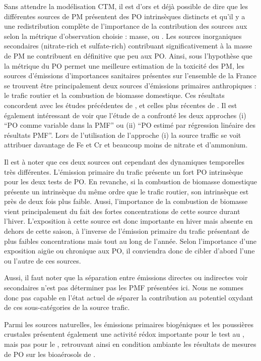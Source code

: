Sans attendre la modélisation CTM, il est d'ors et déjà possible de dire que les
différentes sources de PM présentent des PO intrinsèques distincts et qu'il y a une
redistribution complète de l'importance de la contribution des sources aux \PMdix{} selon
la métrique d'observation choisie : masse, \POAAv{} ou \PODTTv. Les sources inorganiques
secondaires (nitrate-rich et sulfate-rich) contribuant significativement à la masse de PM
ne contribuent en définitive que peu aux PO. Ainsi, sous l'hypothèse que la métrique du PO
permet une meilleure estimation de la toxicité des PM, les sources d'émissions
d'importances sanitaires présentes sur l'ensemble de la France se trouvent être
principalement deux sources d'émissions primaires anthropiques : le trafic routier et la
combustion de biomasse domestique. Ces résultats concordent avec les études précédentes de
\cite{batesReactive2015,fangOxidative2016}, et celles plus récentes de
\cite{paraskevopoulouYearlong2019,cesariSource2019}. Il est également intéressant de voir
que l'étude de \cite{cesariSource2019} a confronté les deux approches (i) ``PO comme
variable dans la PMF'' ou (ii) ``PO estimé par régression linéaire des résultats PMF''.
Lors de l'utilisation de l'approche (i) la source traffic se voit attribuer davantage de Fe
et Cr et beaucoup moins de nitrate et d'ammonium.

Il est à noter que ces deux sources ont cependant des dynamiques temporelles très différentes. L'émission
primaire du trafic présente un fort PO intrinsèque pour les deux tests de PO.
En revanche, si la combustion de biomasse domestique présente un \POAA{} intrinsèque du
même ordre que le trafic routier, son \PODTT{} intrinsèque est près de deux fois plus
faible. Aussi, l'importance de la combustion de biomasse vient principalement du fait des
fortes concentrations de cette source durant l'hiver. L'exposition à cette source est donc
importante en hiver mais absente en dehors de cette saison, à l'inverse de l'émission
primaire du trafic présentant de plus faibles concentrations mais tout au long de l'année.
Selon l'importance d'une exposition aigüe ou chronique aux PO, il conviendra donc de
cibler d'abord l'une ou l'autre de ces sources.

Aussi, il faut noter que la séparation entre émissions directes ou indirectes voir
secondaires n'est pas déterminer pas les PMF présentées ici. Nous ne sommes donc pas
capable en l'état actuel de séparer la contribution au potentiel oxydant de ces
sous-catégories de la source trafic.

Parmi les sources naturelles, les émissions primaires biogéniques et les poussières
crustales présentent également une activité rédox importante pour le test au \PODTT, mais
pas pour le \POAA, retrouvant ainsi en condition ambiante les résultats de mesures de PO
sur les bioaérosols de \cite{samakeUnexpected2017}.

